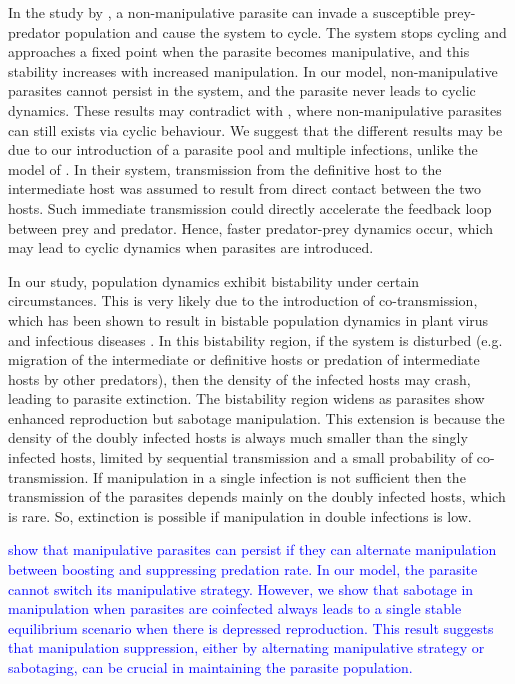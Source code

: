 \documentclass[a4paper]{scrartcl}
\newcommand{\cha}[1]{\textcolor{blue}{#1}}
\begin{document}
In the study by \cite{Rogawa2018}, a non-manipulative parasite can invade a susceptible prey-predator population and cause the system to cycle. 
The system stops cycling and approaches a fixed point when the parasite becomes manipulative, and this stability increases with increased manipulation.
In our model, non-manipulative parasites cannot persist in the system, and the parasite never leads to cyclic dynamics. 
These results may contradict with \cite{Rogawa2018}, where non-manipulative parasites can still exists via cyclic behaviour. 
We suggest that the different results may be due to our introduction of a parasite pool and multiple infections, unlike the model of \cite{Rogawa2018}. 
In their system, transmission from the definitive host to the intermediate host was assumed to result from direct contact between the two hosts. 
Such immediate transmission could directly accelerate the feedback loop between prey and predator. 
Hence, faster predator-prey dynamics occur, which may lead to cyclic dynamics when parasites are introduced.

In our study, population dynamics exhibit bistability under certain circumstances. 
This is very likely due to the introduction of co-transmission, which has been shown to result in bistable population dynamics in plant virus \cite{allen_modelling_2019} and infectious diseases \cite{gao_coinfection_2016-1}.
 In this bistability region, if the system is disturbed (e.g. migration of the intermediate or definitive hosts or predation of intermediate hosts by other predators), then the density of the infected hosts may crash, leading to parasite extinction. 
The bistability region widens as parasites show enhanced reproduction but sabotage manipulation. 
This extension is because the density of the doubly infected hosts is always much smaller than the singly infected hosts, limited by sequential transmission and a small probability of co-transmission. 
If manipulation in a single infection is not sufficient then the transmission of the parasites depends mainly on the doubly infected hosts, which is rare. 
So, extinction is possible if manipulation in double infections is low.

\cha{\cite{Iritani2018} show that manipulative parasites can persist if they can alternate manipulation between boosting and suppressing predation rate. 
In our model, the parasite cannot switch its manipulative strategy. 
However, we show that sabotage in manipulation when parasites are coinfected always leads to a single stable equilibrium scenario when there is depressed reproduction. 
This result suggests that manipulation suppression, either by alternating manipulative strategy or sabotaging, can be crucial in maintaining the parasite population.}
\end{document}

